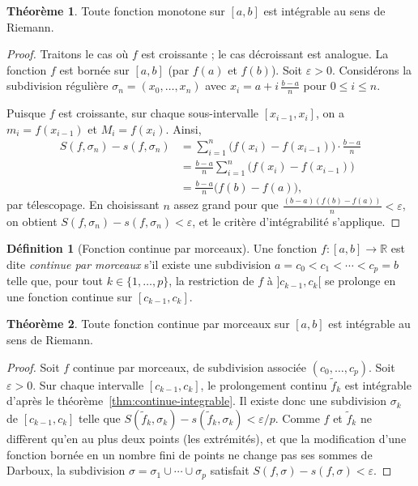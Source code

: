 \documentclass[12pt,a4paper,openany]{book}
\theoremstyle{definition}
\newtheorem{definition}{Définition}[chapter]
\newtheorem{theoreme}{Théorème}[chapter]
\newcommand{\R}{\mathbb{R}}
\newcommand{\eps}{\varepsilon}
\begin{document}
\begin{theoreme}\label{thm:monotone-integrable}
  Toute fonction monotone sur $[a,b]$ est intégrable au sens de Riemann.
\end{theoreme}

\begin{proof}
  Traitons le cas où $f$ est croissante ; le cas décroissant est analogue. La fonction $f$ est bornée sur $[a,b]$ (par $f(a)$ et $f(b)$). Soit $\eps > 0$. Considérons la subdivision régulière $\sigma_n = (x_0, \ldots, x_n)$ avec $x_i = a + i\,\frac{b-a}{n}$ pour $0 \leqslant i \leqslant n$.

  Puisque $f$ est croissante, sur chaque sous-intervalle $[x_{i-1}, x_i]$, on a $m_i = f(x_{i-1})$ et $M_i = f(x_i)$. Ainsi,
  \begin{align*}
    S(f, \sigma_n) - s(f, \sigma_n)
    &= \sum_{i=1}^{n} \bigl(f(x_i) - f(x_{i-1})\bigr) \cdot \frac{b-a}{n} \\
    &= \frac{b-a}{n} \sum_{i=1}^{n} \bigl(f(x_i) - f(x_{i-1})\bigr) \\
    &= \frac{b-a}{n} \bigl(f(b) - f(a)\bigr),
  \end{align*}
  par télescopage. En choisissant $n$ assez grand pour que $\frac{(b-a)(f(b)-f(a))}{n} < \eps$, on obtient $S(f,\sigma_n) - s(f,\sigma_n) < \eps$, et le critère d'intégrabilité s'applique.
\end{proof}

\begin{definition}[Fonction continue par morceaux]\label{def:continue-par-morceaux}
  Une fonction $f \colon [a,b] \to \R$ est dite \emph{continue par morceaux} s'il existe une subdivision $a = c_0 < c_1 < \cdots < c_p = b$ telle que, pour tout $k \in \{1, \ldots, p\}$, la restriction de $f$ à $]c_{k-1}, c_k[$ se prolonge en une fonction continue sur $[c_{k-1}, c_k]$.
\end{definition}

\begin{theoreme}\label{thm:cpm-integrable}
  Toute fonction continue par morceaux sur $[a,b]$ est intégrable au sens de Riemann.
\end{theoreme}

\begin{proof}
  Soit $f$ continue par morceaux, de subdivision associée $(c_0, \ldots, c_p)$. Soit $\eps > 0$. Sur chaque intervalle $[c_{k-1}, c_k]$, le prolongement continu $\tilde{f}_k$ est intégrable d'après le théorème~\ref{thm:continue-integrable}. Il existe donc une subdivision $\sigma_k$ de $[c_{k-1}, c_k]$ telle que $S(\tilde{f}_k, \sigma_k) - s(\tilde{f}_k, \sigma_k) < \eps / p$. Comme $f$ et $\tilde{f}_k$ ne diffèrent qu'en au plus deux points (les extrémités), et que la modification d'une fonction bornée en un nombre fini de points ne change pas ses sommes de Darboux, la subdivision $\sigma = \sigma_1 \cup \cdots \cup \sigma_p$ satisfait $S(f,\sigma) - s(f,\sigma) < \eps$.
\end{proof}
\end{document}

